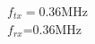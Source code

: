 \documentclass[preview]{standalone}
\begin{document}
\begin{center}
$f_{tx}=$0.36MHz\\$f_{rx}$=0.36MHz
\end{center}
\end{document}
